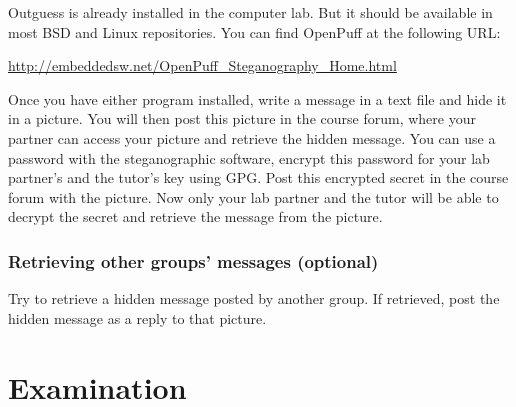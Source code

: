 \documentclass[a4paper]{llncs}
\begin{document}
Outguess is already installed in the computer lab.
But it should be available in most BSD and Linux repositories.
You can find OpenPuff at the following URL\@:
\begin{center}
  \url{http://embeddedsw.net/OpenPuff_Steganography_Home.html}
\end{center}

Once you have either program installed, write a message in a text file and hide 
it in a picture.
You will then post this picture in the course forum, where your partner can
access your picture and retrieve the hidden message.
You can use a password with the steganographic software, encrypt this password 
for your lab partner's and the tutor's key using \ac{GPG}.
Post this encrypted secret in the course forum with the picture.
Now only your lab partner and the tutor will be able to decrypt the secret and 
retrieve the message from the picture.

\subsubsection{Retrieving other groups' messages (optional)}%
\label{subsec:Stegopt}

Try to retrieve a hidden message posted by another group.
If retrieved, post the hidden message as a reply to that picture.

% 
%
%


\section{Examination}%
\label{sec:Exam}
\end{document}
